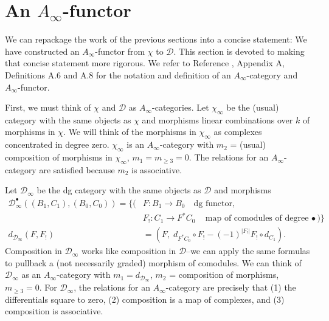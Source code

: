 \section{An $A_\infty$-functor}
\label{sec:A_infinity}
We can repackage the work of the previous 
sections into a concise statement: We have 
constructed an $A_\infty$-functor from 
$\chi$ to $\mathcal{D}$. This section is 
devoted to making that concise statement 
more rigorous. We refer to Reference 
\cite{F}, Appendix A, Definitions 
A.6 and A.8 for the notation and 
definition of an 
$A_\infty$-category and  
$A_\infty$-functor.

First, we must think of $\chi$ and 
$\mathcal{D}$ as $A_\infty$-categories. 
Let $\chi_\infty$ be the (usual) category 
with the same objects as $\chi$ and 
morphisms linear combinations over $k$ 
of morphisms in $\chi$. We will think of 
the morphisms in $\chi_\infty$ as 
complexes concentrated in degree zero. 
$\chi_\infty$ is an $A_\infty$-category 
with $m_2$ = (usual) composition of 
morphisms in $\chi_\infty$, $m_1 = 
m_{\geq 3} = 0$. The relations for an 
$A_\infty$-category are satisfied 
because $m_2$ is associative.

Let $\mathcal{D}_\infty$ be the 
dg category with the same objects 
as $\mathcal{D}$ and morphisms
\begin{align*}
\mathcal{D}_\infty^\bullet((B_1, C_1), (B_0,C_0))
= \big\{ \big(
& F: 
B_1 \to B_0 \quad \textrm{dg functor},\\
& F_!:
C_1 \to F^*C_0 \quad \textrm{map of 
comodules of degree $\bullet$}
\big) \big\}\\
d_{\mathcal{D}_\infty}(F,F_!)
&=
(F,\; d_{F^*C_0} \circ F_! - (-1)^{|F_!|} 
F_! \circ d_{C_1}).
\end{align*}
Composition in $\mathcal{D}_\infty$ works 
like composition in $\mathcal{D}$--we 
can apply the same formulas to pullback 
a (not necessarily graded) morphism of 
comodules. We can think of 
$\mathcal{D}_\infty$ 
as an $A_\infty$-category with $m_1 = 
d_{\mathcal{D}_\infty}$, $m_2$ =  
composition of morphisms, $m_{\geq 3} = 0$. 
For $\mathcal{D}_\infty$, the relations for an 
$A_\infty$-category are precisely that 
(1) the differentials square to zero, 
(2) composition is a map of 
complexes, and (3) composition is 
associative.

